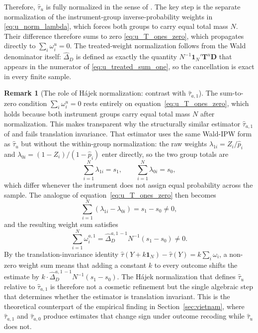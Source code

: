 \documentclass[12pt, a4paper, oneside]{article}
\theoremstyle{plain}
\theoremstyle{definition}
\newtheorem{remark}[proposition]{Remark}
\begin{document}
Therefore, $\hat\tau_u$ is fully normalized in the sense of \citet{knaus2024treatment}.
The key step is the separate normalization of the instrument-group inverse-probability
weights in \eqref{eq:u_norm_lambda}, which forces both groups to carry equal total
mass $N$. Their difference therefore sums to zero \eqref{eq:u_T_ones_zero}, which
propagates directly to $\sum_i\omega_i^u = 0$. The treated-weight normalization
follows from the Wald denominator itself: $\widehat\Delta_D$ is defined as exactly the
quantity $N^{-1}\mathbf{1}_N'\mathbf{T}^u\mathbf{D}$ that appears in the numerator of
\eqref{eq:u_treated_sum_one}, so the cancellation is exact in every finite sample.
\begin{remark}[The role of Hájek normalization: contrast with $\hat\tau_{a,1}$]
\label{rem:hajek_contrast}
The sum-to-zero condition $\sum_i \omega_i^u = 0$ rests entirely on
equation~\eqref{eq:u_T_ones_zero}, which holds because both instrument groups carry
equal total mass $N$ after normalization. This makes transparent why the structurally
similar estimator $\hat\tau_{a,1}$ of \citet{frolich2007nonparametric} and \citet{tan2006regression} fails
translation invariance. That estimator uses the same Wald-IPW form as $\hat\tau_u$
but without the within-group normalization: the raw weights $\lambda_{1i} = Z_i/\hat{p}_i$
and $\lambda_{0i} = (1-Z_i)/(1-\hat{p}_i)$ enter directly, so the two group totals are
\begin{equation}
  \sum_{i=1}^N \lambda_{1i} = s_1,
  \qquad
  \sum_{i=1}^N \lambda_{0i} = s_0,
  \label{eq:unnorm_sums}
\end{equation}
which differ whenever the instrument does not assign equal probability across the sample.
The analogue of equation~\eqref{eq:u_T_ones_zero} then becomes
\begin{equation}
  \sum_{i=1}^N \left(\lambda_{1i} - \lambda_{0i}\right) = s_1 - s_0 \neq 0,
  \label{eq:unnorm_diff}
\end{equation}
and the resulting weight sum satisfies
\begin{equation}
  \sum_{i=1}^N \omega_i^{a,1}
  = \widehat\Delta_D^{a,1\,-1} N^{-1}(s_1 - s_0) \neq 0.
  \label{eq:unnorm_weight_sum}
\end{equation}
By the translation-invariance identity $\hat\tau(Y + k\mathbf{1}_N) - \hat\tau(Y)
= k\sum_i\omega_i$, a non-zero weight sum means that adding a constant $k$ to every
outcome shifts the estimate by $k \cdot \widehat\Delta_D^{a,1\,-1} N^{-1}(s_1 - s_0)$.
The Hájek normalization that defines $\hat\tau_u$ relative to $\hat\tau_{a,1}$ is
therefore not a cosmetic refinement but the single algebraic step that determines
whether the estimator is translation invariant.
This is the theoretical counterpart of the empirical finding in
Section~\ref{sec:vietnam}, where $\hat\tau_{a,1}$ and $\hat\tau_{a,0}$ produce
estimates that change sign under outcome recoding while $\hat\tau_u$ does not.
\end{remark}
 
\end{document}
